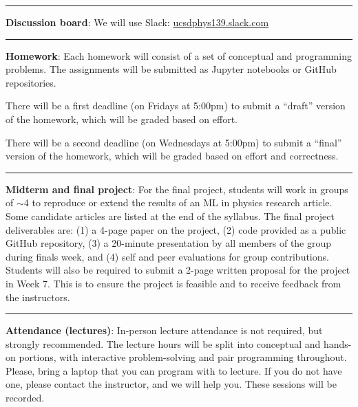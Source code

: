 \documentclass[12pt]{article}
\begin{document}
\begin{center}
	\rule{\textwidth}{0.5pt}
\end{center}

\noindent\textbf{Discussion board}: We will use Slack: \href{https://join.slack.com/t/ucsdphys139/shared\_invite/zt-110gwd4lx-pZBsItfcxhbOD5BV6afVDA}{ucsdphys139.slack.com}

\begin{center}
	\rule{\textwidth}{0.5pt}
\end{center}

\noindent\textbf{Homework}: Each homework will consist of a set of conceptual and programming problems.
The assignments will be submitted as Jupyter notebooks or GitHub repositories.

There will be a first deadline (on Fridays at 5:00pm) to submit a ``draft'' version of the homework, which will be graded based on effort.

There will be a second deadline (on Wednesdays at 5:00pm) to submit a ``final'' version of the homework, which will be graded based on effort and correctness.

\begin{center}
	\rule{\textwidth}{0.5pt}
\end{center}

\noindent\textbf{Midterm and final project}:
For the final project, students will work in groups of $\sim$4 to reproduce or extend the results of an ML in physics research article.
Some candidate articles are listed at the end of the syllabus.
The final project deliverables are: (1) a 4-page paper on the project, (2) code provided as a public GitHub repository, (3) a 20-minute presentation by all members of the group during finals week, and (4) self and peer evaluations for group contributions.
Students will also be required to submit a 2-page written proposal for the project in Week 7.
This is to ensure the project is feasible and to receive feedback from the instructors.

\begin{center}
	\rule{\textwidth}{0.5pt}
\end{center}

\noindent\textbf{Attendance (lectures)}: In-person lecture attendance is not required, but strongly recommended.
The lecture hours will be split into conceptual and hands-on portions, with interactive problem-solving and pair programming throughout.
Please, bring a laptop that you can program with to lecture.
If you do not have one, please contact the instructor, and we will help you.
These sessions will be recorded.
\end{document}
